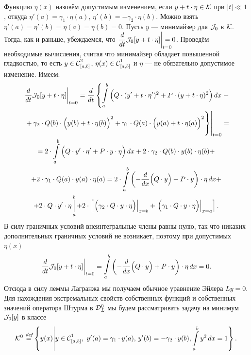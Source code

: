 Функцию $\eta(x)$ назовём допустимым изменением, если $y+t\cdot\eta\in\K$ при $|t|\ll1$, откуда $\eta'(a)={\gamma_1\cdot\eta(a)}$, $\eta'(b)=-\gamma_2\cdot\eta(b)$. Можно взять $\eta'(a)=\eta'(b)=\eta(a)=\eta(b)=0$. Пусть $y$ --- минимайзер для $\J_0$ в $\K$. Тогда{\mb,} как и раньше{\mb,} убеждаемся, что $\displaystyle\left.\der{}{t}\J_0[y+t\cdot\eta]\right|_{\lefteqn{\scriptstyle t=0}}=0$. Проведём необходимые вычисления, считая что минимайзер обладает повышенной гладкостью, то есть $y\in\Cfn[{[a,b]}]{2}$, ${\eta(x)\in\Cfn[{[a,b]}]{1}}$ и $\eta$ --- не обязательно допустимое изменение. Имеем:
\begin{multline*}
	\left.\der{}{t}\J_0[y+t\cdot\eta]\right|_{t=0}=\der{}{t}\left\{\int\limits_a^b\Big( Q\cdot(y'+t\cdot\eta')^2+P\cdot(y+t\cdot\eta)^2\Big)\,dx\right.+\\\left.\left.\vphantom{\int\limits_a^b}+\gamma_2\cdot Q(b)\cdot\Big(y(b)+t\cdot\eta(b)\Big)^2+\gamma_1\cdot Q(a)\cdot\Big(y(a)+t\cdot\eta(a)\Big)^2\right\}\right|_{t=0}=\\=2\cdot\int\limits_a^b\Big(Q\cdot y'\cdot\eta'+P\cdot y\cdot\eta\Big)\,dx+2\cdot\gamma_2\cdot Q(b)\cdot y(b)\cdot\eta(b)+\\
	+2\cdot\gamma_1\cdot Q(a)\cdot y(a)\cdot\eta(a)=2\cdot\int\limits_a^b\left(-\der{}{x}\Big(Q\cdot y\Big)+P\cdot y\right)\cdot\eta\,dx+\\+2\cdot Q\cdot y'\cdot\eta\mathop{\Big|}\limits_a^b
	+2\cdot\left[\left.\Big(\gamma_2\cdot Q\cdot y\cdot\eta\Big)\right|_{ x=b}+\left.\Big(\gamma_1\cdot Q\cdot y\cdot\eta\Big)\right|_{ x=a}\right].
\end{multline*} 
В силу граничных условий внеинтегральные члены равны нулю, так что никаких дополнительных граничных условий не возникает, поэтому при допустимых $\eta(x)$
\begin{equation*}
	\left.\der{}{t}\J_0[y+t\cdot\eta]\right|_{t=0}=\int\limits_a^b\left(-\der{}{x}\Big(Q\cdot y\Big)+P\cdot y\right)\cdot\eta\,dx=0.
\end{equation*} 
Отсюда в силу леммы Лагранжа мы получаем обычное уравнение Эйлера $Ly=0$. Для нахождения экстремальных свойств собственных функций и собственных значений оператора Штурма в $\mc{D}_L^0$ мы будем рассматривать задачу на минимум $\J_0[y]$ в классе 
\begin{equation*}
	\K^0\!\eqdef\!\left\{y(x)\middle|y\in\Cfn[{[a,b]}]{1},\ y'(a)=\gamma_1\cdot y(a),\,y'(b)=-\gamma_2\cdot y(b),\int\limits_a^b y^2\,dx=1\right\}.
\end{equation*}

